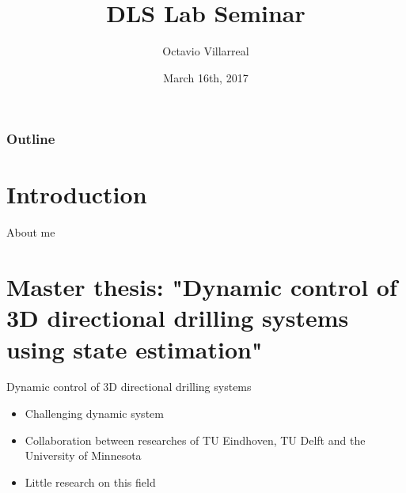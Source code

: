 \documentclass{beamer}
\title[DLS Lab Seminar]{DLS Lab Seminar \vspace{15pt}}
\institute[]{Istituto Italiano di Tecnologia, Genova, Italy \vspace{20pt}}
\author{Octavio Villarreal \vspace{20pt}} %
\date{March 16th, 2017}
\newcommand*\titleTOC{Outline}
\begin{document}
{
\frame{\titlepage}
\begin{frame}\frametitle{\titleTOC}
	\tableofcontents
\end{frame}
}

{
}

\section{Introduction}
\begin{frame}{About me}

\end{frame}
\section{Master thesis: "Dynamic control of 3D directional drilling systems using state estimation"}

\begin{frame}{Dynamic control of 3D directional drilling systems}
	\begin{itemize}\setlength\itemsep{2.5em}
		\item Challenging dynamic system
		\item Collaboration between researches of TU Eindhoven, TU Delft and the University of Minnesota
		\item Little research on this field
	\end{itemize}
\end{frame}
\end{document}
